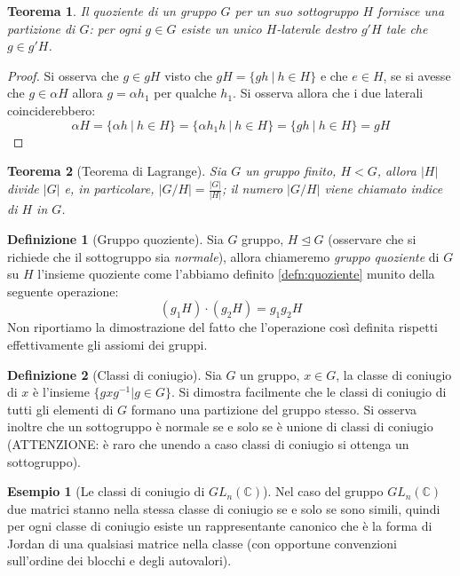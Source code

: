 \documentclass[11pt]{article}
\theoremstyle{plain}
\newtheorem{thm}{Teorema}[section]
\theoremstyle{definition}
\newtheorem{defn}{Definizione}[section]
\newtheorem{exmp}{Esempio}[section]
\theoremstyle{remark}
\newcommand{\C}{\mathbb{C}}
\begin{document}
\begin{thm}
	Il quoziente di un gruppo $G$ per un suo sottogruppo $H$ fornisce una partizione di $G$: per ogni $g\in G$ esiste un unico $H$-laterale destro $g'H$ tale che $g\in g'H$. 
\end{thm}
\begin{proof}
	Si osserva che $g\in gH$ visto che $gH=\{gh\ |\ h\in H\}$ e che $e\in H$, se si avesse che $g\in \alpha H$ allora $g=\alpha h_1$ per qualche $h_1$. Si osserva allora che i due laterali coinciderebbero:
	\[
		\alpha H=\{ \alpha h\ |\ h\in H\} = \{ \alpha h_1 h\ |\ h\in H \} = \{ gh\ |\ h\in H\} = gH
	\]
\end{proof}

\begin{thm}[Teorema di Lagrange]
	Sia $G$ un gruppo finito, $H<G$, allora $|H|$ divide $|G|$ e, in particolare, $\displaystyle |G/H|=\frac{|G|}{|H|}$; il numero $|G/H|$ viene chiamato \textit{indice} di $H$ in $G$.
\end{thm}


\begin{defn}[Gruppo quoziente]
	Sia $G$ gruppo, $H\trianglelefteq G$ (osservare che si richiede che il sottogruppo sia \textit{normale}), allora chiameremo \textit{gruppo quoziente} di $G$ su $H$ l'insieme quoziente come l'abbiamo definito \eqref{defn:quoziente} munito della seguente operazione:
	\[
		(g_1H)\cdot(g_2H)=g_1g_2H
	\]
	Non riportiamo la dimostrazione del fatto che l'operazione così definita rispetti effettivamente gli assiomi dei gruppi.
\end{defn}

\begin{defn}[Classi di coniugio]
Sia $G$ un gruppo, $x \in G$, la classe di coniugio di $x$ è l'insieme $\{ gxg^{-1} | g\in G \}$. Si dimostra facilmente che le classi di coniugio di tutti gli elementi di $G$ formano una partizione del gruppo stesso. Si osserva inoltre che un sottogruppo è normale se e solo se è unione di classi di coniugio (ATTENZIONE: è raro che unendo a caso classi di coniugio si ottenga un sottogruppo).
\end{defn}


\begin{exmp}[Le classi di coniugio di $GL_n(\C)$]
Nel caso del gruppo $GL_n(\C)$ due matrici stanno nella stessa classe di coniugio se e solo se sono simili, quindi per ogni classe di coniugio esiste un rappresentante canonico che è la forma di Jordan di una qualsiasi matrice nella classe (con opportune convenzioni sull'ordine dei blocchi e degli autovalori).
\end{exmp}
\end{document}
